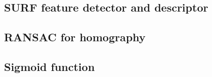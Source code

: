 \subsection{SURF feature detector and descriptor}
\subsection{RANSAC for homography}
\subsection{Sigmoid function}

